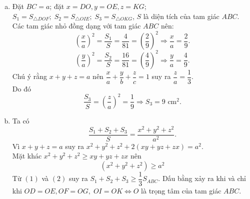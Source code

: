 \begin{bt}
{\begin{center}
\begin{tikzpicture}
			
			\end{tikzpicture}
		\end{center}
		\begin{enumerate}[a)]
			\item Đặt $BC = a$; đặt $x = DO, y = OE, z = KG$; $S_1=S_{\triangle DOF};\; S_2=S_{\triangle OIE};\; S_3=S_{\triangle OKG}$, $S$ là diện tích của tam giác $ABC$. Các tam giác nhỏ đồng dạng với tam giác $ABC$ nên:
			$$\left(\dfrac{x}{a}\right)^2=\dfrac{S_1}{S}=\dfrac{4}{81}=\left(\dfrac{2}{9}\right)^2\Rightarrow \dfrac{x}{a}=\dfrac{2}{9}.$$
			$$\left(\dfrac{y}{a}\right)^2=\dfrac{S_2}{S}=\dfrac{16}{81}=\left(\dfrac{4}{9}\right)^2\Rightarrow\dfrac{y}{a}=\dfrac{4}{9}.$$
			Chú ý rằng $x+y+z = a$ nên $\dfrac{x}{a}+\dfrac{y}{b}+\dfrac{z}{c} = 1$ suy ra $\dfrac{z}{a} = \dfrac{1}{3}$.\\
			Do đó $$\dfrac{S_3}{S}  =\left(\dfrac{z}{a}\right)^2 =\dfrac{1}{9}\Rightarrow S_3 = 9 \mbox{ cm}^2.$$
			\item Ta có 
			\begin{equation}
			\dfrac{S_1+S_2+S_3}{S}=\dfrac{x^2+y^2+z^2}{a^2}.\tag{ 1}
			\end{equation}
			Vì $x+y+z = a$ suy ra $x^2+y^2+z^2 +2(xy+yz+zx) = a^2.$\\
			Mặt khác $x^2+y^2+z^2 \geq xy+yz+zx$ nên
			\begin{equation}
			(x^2+y^2+z^2)\geq a^2 \tag{2}
			\end{equation}
			Từ $(1)$ và $(2)$ suy ra $S_1+S_2+S_3 \geq \dfrac{1}{3}S_{ABC}$. Dấu bằng xảy ra khi và chỉ khi $OD = OE, OF = OG,\; OI = OK \Leftrightarrow O$ là trọng tâm của tam giác $ABC$. 
		\end{enumerate}
		
	}
	
	
	
\end{bt}






















